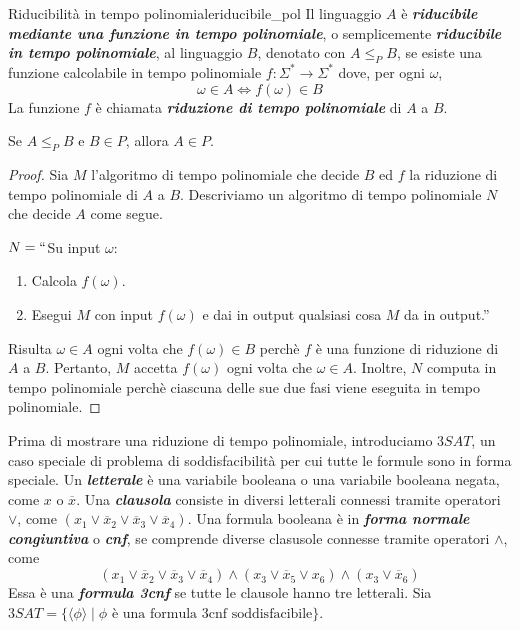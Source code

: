 \documentclass[12pt]{report}
\newcounter{theorem}
\newcounter{definition}
\newcommand{\nmu}{}
\begin{document}
\begin{definition}{\nmu Riducibilità in tempo polinomiale}{riducibile_pol}
	Il linguaggio $A$ è \textbf{\textit{riducibile mediante una funzione in tempo polinomiale}}, o semplicemente \textbf{\textit{riducibile in tempo polinomiale}}, al linguaggio $B$, denotato con $A \leq_P B$, se esiste una funzione calcolabile in tempo polinomiale $f: \Sigma^* \to \Sigma^*$ dove, per ogni $\omega$,
	\[
	\omega\in A \iff f(\omega) \in B
	\]
	La funzione $f$ è chiamata \textbf{\textit{riduzione di tempo polinomiale}} di $A$ a $B$.
\end{definition}
\begin{theorem}{}{}
Se $A\leq_P B$ e $B \in P$, allora $A \in P$.
\end{theorem}
\begin{proof}
	Sia $M$ l'algoritmo di tempo polinomiale che decide $B$ ed $f$ la riduzione di tempo polinomiale di $A$ a $B$. Descriviamo un algoritmo di tempo polinomiale $N$ che decide $A$ come segue.

	$N = ``$Su input $\omega$:
	\begin{enumerate}
		\item Calcola $f(\omega)$.
		\item Esegui $M$ con input $f(\omega)$ e dai in output qualsiasi cosa $M$ da in output.''
	\end{enumerate}
	Risulta $\omega\in A$ ogni volta che $f(\omega) \in B$ perchè $f$ è una funzione di riduzione di $A$ a $B$. Pertanto, $M$ accetta $f(\omega)$ ogni volta che $\omega \in A$. Inoltre, $N$ computa in tempo polinomiale perchè ciascuna delle sue due fasi viene eseguita in tempo polinomiale.
\end{proof}
Prima di mostrare una riduzione di tempo polinomiale, introduciamo $3SAT$, un caso speciale di problema di soddisfacibilità per cui tutte le formule sono in forma speciale. Un \textbf{\textit{letterale}} è una variabile booleana o una variabile booleana negata, come $x$ o $\overline{x}$. Una \textbf{\textit{clausola}} consiste in diversi letterali connessi tramite operatori $\vee$, come $(x_1 \vee \overline{x}_2 \vee \overline{x}_3 \vee \overline{x}_4)$. Una formula booleana è in \textbf{\textit{forma normale congiuntiva}} o \textbf{\textit{cnf}}, se comprende diverse clasusole connesse tramite operatori $\wedge$, come
\[
(x_1 \vee \overline{x}_2 \vee \overline{x}_3 \vee \overline{x}_4) \wedge (x_3 \vee \overline{x}_5 \vee x_6) \wedge (x_3 \vee \overline{x}_6)
\]
Essa è una \textbf{\textit{formula 3cnf}} se tutte le clausole hanno tre letterali. Sia $3SAT = \{\langle \phi \rangle \mid \phi \text{ è una formula 3cnf soddisfacibile}\}.$
\end{document}
